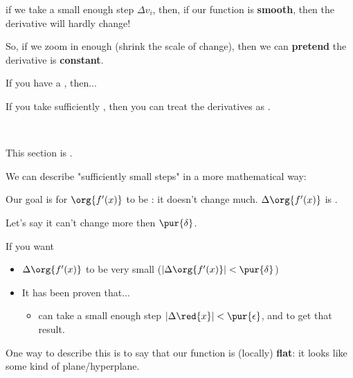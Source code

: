         if we take a small enough step $\Delta v_i$, then, if our function is \textbf{smooth}, then the derivative will hardly change!
            
        So, if we zoom in enough (shrink the scale of change), then we can \textbf{pretend} the derivative is \textbf{constant}.\\
        
        \begin{concept}
            If you have a , then...
            
            If you take sufficiently , then you can treat the derivatives as .
        \end{concept}
        
        \phantom{}\\
        
        \begin{clarification*}
            This section is .
            
            We can describe "sufficiently small steps" in a more mathematical way:
            
            Our goal is for $\org{f'(x)}$ to be : it doesn't change much. $\Delta \org{f'(x)}$ is . 
            
            Let's say it can't change more then $\pur{\delta}$. 
            
            If you want 
            \begin{itemize}
                \item $\Delta \org{f'(x)}$ to be very small ($|\Delta \org{f'(x)}| < \pur{\delta}$)
                \item It has been proven that...
                \begin{itemize}
                    \item can take a small enough step $|\Delta \red{x}| < \pur{\epsilon}$, and to get that result.
                \end{itemize}
            \end{itemize}
        \end{clarification*}
        
        One way to describe this is to say that our function is (locally) \textbf{flat}: it looks like some kind of plane/hyperplane.
            \\
        
